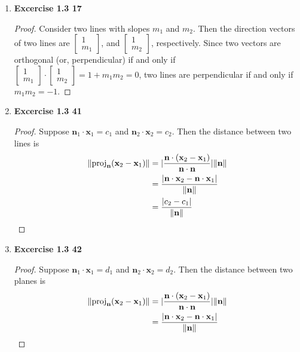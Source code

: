 \begin{enumerate}
\begin{proof}
\begin{enumerate}
			\end{enumerate}
		\end{proof}
	\item \textbf{Excercise 1.3 17}
		\begin{proof}
			Consider two lines with slopes $m_1$ and $m_2$. Then the direction vectors of two lines are $\begin{bmatrix} 1 \\ m_1 \end{bmatrix}$, and $\begin{bmatrix} 1 \\ m_2 \end{bmatrix}$, respectively. Since two vectors are orthogonal (or, perpendicular) if and only if $\begin{bmatrix} 1 \\ m_1 \end{bmatrix} \cdot \begin{bmatrix} 1 \\ m_2 \end{bmatrix} = 1 + m_1m_2 = 0$, two lines are perpendicular if and only if $m_1m_2 = -1$.
		\end{proof}
	\item \textbf{Excercise 1.3 41}
		\begin{proof}
			Suppose $\textbf{n}_1\cdot\textbf{x}_1 = c_1$ and $\textbf{n}_2\cdot\textbf{x}_2 = c_2$. Then the distance between two lines is
			\begin{align*}
				\Vert\textnormal{proj}_\textbf{n}(\textbf{x}_2-\textbf{x}_1)\Vert
				&= |\frac{\textbf{n}\cdot(\textbf{x}_2-\textbf{x}_1)}{\textbf{n}\cdot\textbf{n}}|\Vert\textbf{n}\Vert \\
				&= \frac{|\textbf{n}\cdot\textbf{x}_2 - \textbf{n}\cdot\textbf{x}_1|}{\Vert\textbf{n}\Vert} \\
				&= \frac{|c_2 - c_1|}{\Vert\textbf{n}\Vert}
			\end{align*}
		\end{proof}
	\item \textbf{Excercise 1.3 42}
		\begin{proof}
			Suppose $\textbf{n}_1\cdot\textbf{x}_1 = d_1$ and $\textbf{n}_2\cdot\textbf{x}_2 = d_2$. Then the distance between two planes is
			\begin{align*}
			\Vert\textnormal{proj}_\textbf{n}(\textbf{x}_2-\textbf{x}_1)\Vert
			&= |\frac{\textbf{n}\cdot(\textbf{x}_2-\textbf{x}_1)}{\textbf{n}\cdot\textbf{n}}|\Vert\textbf{n}\Vert \\
			&= \frac{|\textbf{n}\cdot\textbf{x}_2 - \textbf{n}\cdot\textbf{x}_1|}{\Vert\textbf{n}\Vert} \\

\end{align*}
\end{proof}
\end{enumerate}
